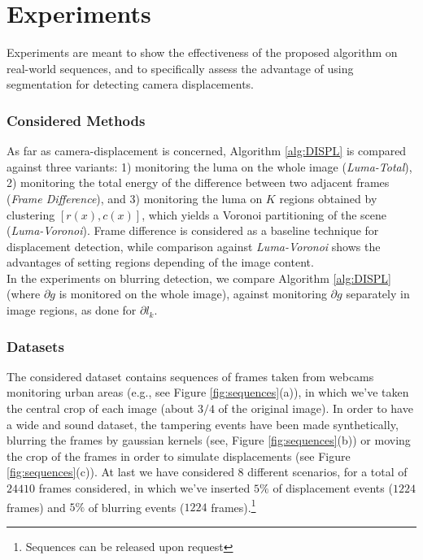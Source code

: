 \documentclass{llncs}
\begin{document}
\section{Experiments}\label{sec:experiments}
Experiments are meant to show the effectiveness of the proposed algorithm on real-world sequences, and to specifically assess the advantage of using segmentation for detecting camera displacements. 
\vspace{-0.3cm}
\subsubsection{Considered Methods}
As far as camera-displacement is concerned, Algorithm \eqref{alg:DISPL} is compared against three variants: 1) monitoring the luma on the whole image (\emph{Luma-Total}), 2) monitoring the total energy of the difference between two adjacent frames (\emph{Frame Difference}), and 3) monitoring the luma on $K$ regions obtained by clustering $[r(x), c(x)]$, which yields a Voronoi partitioning of the scene (\emph{Luma-Voronoi}). Frame difference is considered as a baseline technique for displacement detection, while comparison against \emph{Luma-Voronoi} shows the advantages of setting regions depending of the image content. \\
In the experiments on blurring detection, we compare Algorithm \ref{alg:DISPL} (where $\partial g$ is monitored on the whole image), against monitoring $\partial g$ separately in image regions, as done for $\partial l_k$.
\vspace{-0.3cm}
\subsubsection{Datasets}
The considered dataset contains  sequences of  frames taken from webcams monitoring urban areas (e.g., see Figure \ref{fig:sequences}(a)), in which we've taken the central crop of each image (about $3/4$ of the original image). 
In order to have a wide and sound dataset, the tampering events have been made synthetically, blurring the frames by gaussian kernels (see, Figure \ref{fig:sequences}(b)) or moving the crop of the frames in order to simulate displacements (see Figure \ref{fig:sequences}(c)). 
At last we have considered $8$ different scenarios, for a total of $24410$ frames considered, in which we've inserted $5\%$ of displacement events ($1224$ frames) and $5\%$ of blurring events ($1224$ frames).\footnote{Sequences can be released upon request}
\vspace{-0.3cm}
\end{document}
